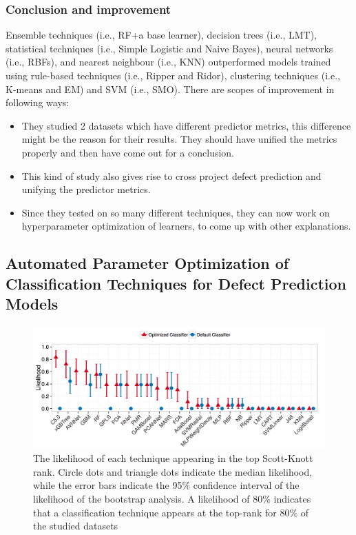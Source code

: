 \documentclass[conference]{IEEEtran}
\begin{document}
\subsubsection{\textbf{Conclusion and improvement}}
Ensemble techniques (i.e., RF+a base learner), decision trees
(i.e., LMT), statistical techniques (i.e., Simple Logistic and
Naive Bayes), neural networks (i.e., RBFs), and nearest neighbour
(i.e., KNN) outperformed models trained using rule-based
techniques (i.e., Ripper and Ridor), clustering techniques (i.e.,
K-means and EM) and SVM (i.e., SMO).
There are scopes of improvement in following ways:
\begin{itemize}
    \item They studied 2 datasets which have different predictor metrics, this difference might be the reason for their results. They should have unified the metrics properly and then have come out for a conclusion. 
    \item This kind of study also gives rise to cross project defect prediction and unifying the predictor metrics.
    \item Since they tested on so many different techniques, they can now work on hyperparameter optimization of learners, to come up with other explanations.
\end{itemize}

\subsection{\textbf{Automated Parameter Optimization of Classification Techniques for Defect Prediction Models~\cite{tantithamthavorn2016automated}}}
\begin{figure}[!htbp]
    \centering
    \includegraphics[width=\linewidth]{Read_8.png}
    \caption{The likelihood of each technique appearing in the top Scott-Knott rank. Circle dots and
triangle dots indicate the median likelihood, while the error bars indicate the 95\% confidence interval of the
likelihood of the bootstrap analysis. A likelihood of 80\% indicates that a classification technique appears at
the top-rank for 80\% of the studied datasets}
    \label{fig:c}
\end{figure}
\end{document}
